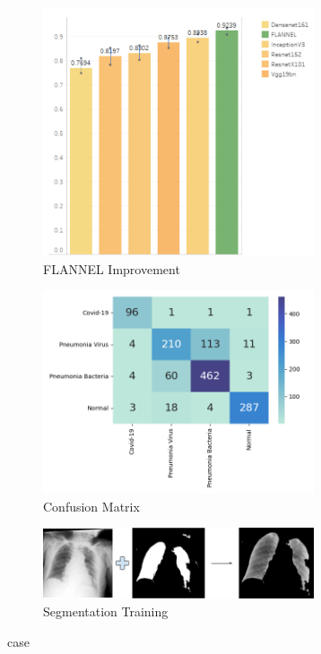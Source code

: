 \documentclass{sigkddExp}
\begin{document}
\begin{figure}[h]
    \includegraphics[width=8cm]{../doc/images/F1Score_vs_rest.png}
    \caption{FLANNEL Improvement}
    \label{fig:f1score}
\end{figure}


\begin{figure}[h]
    \includegraphics[width=8cm]{../doc/images/confusion_matrix.png}
    \caption{Confusion Matrix}
    \label{fig:cfmatrix}
\end{figure}

\begin{figure}[h]
    \includegraphics[width=8cm]{../doc/images/segmentation_training.png}
    \caption{Segmentation Training}
    \label{fig:segtrain}
\end{figure}


\newpage
%

case
\end{document}
